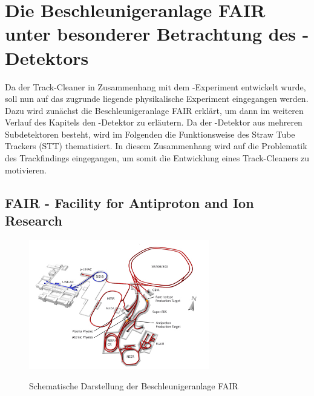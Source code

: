 \chapter{Die Beschleunigeranlage FAIR unter besonderer Betrachtung des \pnd{}-Detektors}

Da der Track-Cleaner in Zusammenhang mit dem \pnd{}-Experiment entwickelt wurde, soll nun auf das zugrunde liegende physikalische Experiment eingegangen werden. Dazu wird zunächst die Beschleunigeranlage FAIR erklärt, um dann im weiteren Verlauf des Kapitels den \pnd{}-Detektor zu erläutern. Da der \pnd{}-Detektor aus mehreren Subdetektoren besteht, wird im Folgenden die Funktionsweise des Straw Tube Trackers (STT) thematisiert. In diesem Zusammenhang wird auf die Problematik des Trackfindings eingegangen, um somit die Entwicklung eines Track-Cleaners zu motivieren.

\section{FAIR - Facility for Antiproton and Ion Research}
\begin{figure}
  \includegraphics[width=0.7\textwidth]{Bilder/Fair}
	\label{fig:FAIR}
	\caption{Schematische Darstellung der Beschleunigeranlage FAIR}
\end{figure}

